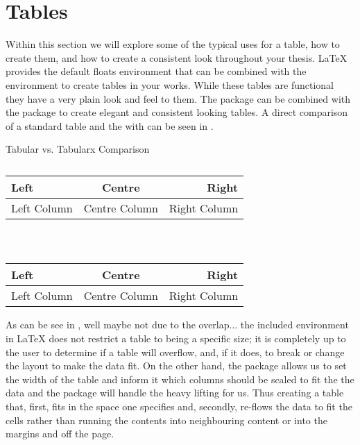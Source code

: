   \section{Tables}
  Within this section we will explore some of the typical uses for a table, how to create them, and how to create a consistent look throughout your thesis.
  \LaTeX{} provides the default floats environment  that can be combined with the  environment to create tables in your works. 
  While these tables are functional they have a very plain look and feel to them.
  The package  can be combined with the  package to create elegant and consistent looking tables.
  A direct comparison of a standard table and the  with  can be seen in .
  \begin{table}[H]
    \caption{Tabular vs. Tabularx Comparison}\label{tab:tableComparison}
    \centering
    \begin{subtable}{0.45\textwidth}
        \caption{}\label{tab:tableComparison:b}
        \begin{tabular}{lcr} 
          \hline
            \textbf{Left} & \textbf{Centre} & \textbf{Right}\\%
          \hline
            Left Column & Centre Column & Right Column \\%
          \hline
        \end{tabular}
    \end{subtable}
    ~
    \begin{subtable}{0.45\textwidth}
        \caption{}\label{tab:tableComparison:a}
        \begin{tabularx}{\textwidth}{LCR} 
          \toprule
            \textbf{Left} & \textbf{Centre} & \textbf{Right}\\
          \midrule
            Left Column & Centre Column & Right Column \\
          \bottomrule
        \end{tabularx}
    \end{subtable}
  \end{table}
  As can be see in , well maybe not due to the overlap... the included  environment in \LaTeX{} does not restrict a table to being a specific size; it is completely up to the user to determine if a table will overflow, and, if it does, to break or change the layout to make the data fit.
  On the other hand, the  package allows us to set the width of the table and inform it which columns should be scaled to fit the the data and the  package will handle the heavy lifting for us.
  Thus creating a table that, first, fits in the space one specifies and, secondly, re-flows the data to fit the cells rather than running the contents into neighbouring content or into the margins and off the page.
  
